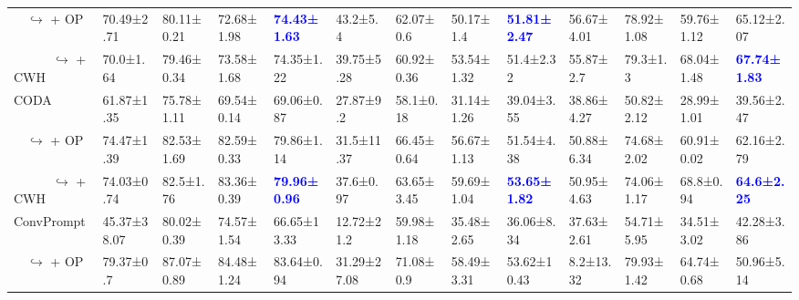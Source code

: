 \begin{table*}[ht]
{\begin{tabular}{l|llla|llla|llla}
\ \  $\hookrightarrow$ + OP                  & 70.49{\scriptsize±2.71} & 80.11{\scriptsize±0.21} & 72.68{\scriptsize±1.98} & \textbf{\textcolor{blue}{74.43{\scriptsize±1.63}}} & 43.2{\scriptsize±5.4} & 62.07{\scriptsize±0.6} & 50.17{\scriptsize±1.4} & \textbf{\textcolor{blue}{51.81{\scriptsize±2.47}}} & 56.67{\scriptsize±4.01} & 78.92{\scriptsize±1.08} & 59.76{\scriptsize±1.12} & 65.12{\scriptsize±2.07} \\
\ \ \ \ \ \ $\hookrightarrow$ + CWH          & 70.0{\scriptsize±1.64} & 79.46{\scriptsize±0.34} & 73.58{\scriptsize±1.68} & 74.35{\scriptsize±1.22} & 39.75{\scriptsize±5.28} & 60.92{\scriptsize±0.36} & 53.54{\scriptsize±1.32} & 51.4{\scriptsize±2.32} & 55.87{\scriptsize±2.7} & 79.3{\scriptsize±1.3} & 68.04{\scriptsize±1.48} & \textbf{\textcolor{blue}{67.74{\scriptsize±1.83}}} \\
\hline
CODA                                         & 61.87{\scriptsize±1.35} & 75.78{\scriptsize±1.11} & 69.54{\scriptsize±0.14} & 69.06{\scriptsize±0.87} & 27.87{\scriptsize±9.2} & 58.1{\scriptsize±0.18} & 31.14{\scriptsize±1.26} & 39.04{\scriptsize±3.55} & 38.86{\scriptsize±4.27} & 50.82{\scriptsize±2.12} & 28.99{\scriptsize±1.01} & 39.56{\scriptsize±2.47} \\ 
\ \  $\hookrightarrow$ + OP                  & 74.47{\scriptsize±1.39} & 82.53{\scriptsize±1.69} & 82.59{\scriptsize±0.33} & 79.86{\scriptsize±1.14} & 31.5{\scriptsize±11.37} & 66.45{\scriptsize±0.64} & 56.67{\scriptsize±1.13} & 51.54{\scriptsize±4.38} & 50.88{\scriptsize±6.34} & 74.68{\scriptsize±2.02} & 60.91{\scriptsize±0.02} & 62.16{\scriptsize±2.79} \\
\ \ \ \ \ \ $\hookrightarrow$ + CWH          & 74.03{\scriptsize±0.74} & 82.5{\scriptsize±1.76} & 83.36{\scriptsize±0.39} & \textbf{\textcolor{blue}{79.96{\scriptsize±0.96}}} & 37.6{\scriptsize±0.97} & 63.65{\scriptsize±3.45} & 59.69{\scriptsize±1.04} & \textbf{\textcolor{blue}{53.65{\scriptsize±1.82}}} & 50.95{\scriptsize±4.63} & 74.06{\scriptsize±1.17} & 68.8{\scriptsize±0.94} & \textbf{\textcolor{blue}{64.6{\scriptsize±2.25}}} \\
\hline
ConvPrompt                                   & 45.37{\scriptsize±38.07} & 80.02{\scriptsize±0.39} & 74.57{\scriptsize±1.54} & 66.65{\scriptsize±13.33} & 12.72{\scriptsize±21.2} & 59.98{\scriptsize±1.18} & 35.48{\scriptsize±2.65} & 36.06{\scriptsize±8.34} & 37.63{\scriptsize±2.61} & 54.71{\scriptsize±5.95} & 34.51{\scriptsize±3.02} & 42.28{\scriptsize±3.86} \\
\ \  $\hookrightarrow$ + OP                  & 79.37{\scriptsize±0.7} & 87.07{\scriptsize±0.89} & 84.48{\scriptsize±1.24} & 83.64{\scriptsize±0.94} & 31.29{\scriptsize±27.08} & 71.08{\scriptsize±0.9} & 58.49{\scriptsize±3.31} & 53.62{\scriptsize±10.43} & 8.2{\scriptsize±13.32} & 79.93{\scriptsize±1.42} & 64.74{\scriptsize±0.68} & 50.96{\scriptsize±5.14} \\

\end{tabular}}
\end{table*}
